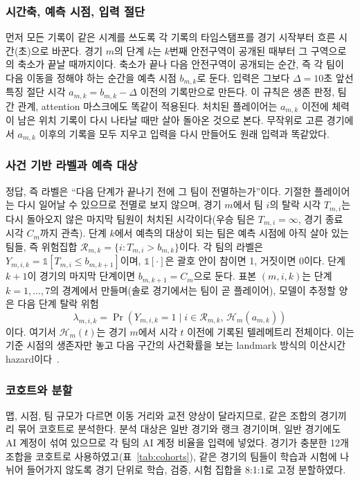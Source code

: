 \subsubsection{시간축, 예측 시점, 입력 절단}
먼저 모든 기록이 같은 시계를 쓰도록 각 기록의 타임스탬프를 경기 시작부터 흐른 시간(초)으로 바꾼다.
경기 $m$의 단계 $k$는 $k$번째 안전구역이 공개된 때부터 그 구역으로의 축소가 끝날 때까지이다.
축소가 끝나 다음 안전구역이 공개되는 순간, 즉 각 팀이 다음 이동을 정해야 하는 순간을 예측 시점 $b_{m,k}$로 둔다.
입력은 그보다 $\Delta=10$초 앞선 특징 절단 시각 $a_{m,k}=b_{m,k}-\Delta$ 이전의 기록만으로 만든다.
이 규칙은 생존 판정, 팀 간 관계, attention 마스크에도 똑같이 적용된다.
처치된 플레이어는 $a_{m,k}$ 이전에 체력이 남은 위치 기록이 다시 나타날 때만 살아 돌아온 것으로 본다.
무작위로 고른 경기에서 $a_{m,k}$ 이후의 기록을 모두 지우고 입력을 다시 만들어도 원래 입력과 똑같았다.

\subsubsection{사건 기반 라벨과 예측 대상}
정답, 즉 라벨은 “다음 단계가 끝나기 전에 그 팀이 전멸하는가”이다.
기절한 플레이어는 다시 일어날 수 있으므로 전멸로 보지 않으며, 경기 $m$에서 팀 $i$의 탈락 시각 $T_{m,i}$는 다시 돌아오지 않은 마지막 팀원이 처치된 시각이다(우승 팀은 $T_{m,i}=\infty$, 경기 종료 시각 $C_m$까지 관측).
단계 $k$에서 예측의 대상이 되는 팀은 예측 시점에 아직 살아 있는 팀들, 즉 위험집합 $\mathcal{R}_{m,k}=\{i: T_{m,i}>b_{m,k}\}$이다.
각 팀의 라벨은 $Y_{m,i,k}=\mathbb{1}[T_{m,i}\le b_{m,k+1}]$이며, $\mathbb{1}[\cdot]$은 괄호 안이 참이면 1, 거짓이면 0이다. 단계 $k+1$이 경기의 마지막 단계이면 $b_{m,k+1}=C_m$으로 둔다.
표본 $(m,i,k)$는 단계 $k=1,\dots,7$의 경계에서 만들며(솔로 경기에서는 팀이 곧 플레이어), 모델이 추정할 양은 다음 단계 탈락 위험
\begin{equation}
\lambda_{m,i,k}=\Pr\!\left(Y_{m,i,k}=1 \mid i\in\mathcal{R}_{m,k},\,\mathcal{H}_{m}(a_{m,k})\right)
\label{eq:hazard}
\end{equation}
이다. 여기서 $\mathcal{H}_{m}(t)$는 경기 $m$에서 시각 $t$ 이전에 기록된 텔레메트리 전체이다.
이는 기준 시점의 생존자만 놓고 다음 구간의 사건확률을 보는 landmark 방식의 이산시간 hazard이다~\cite{SingerWillett93,vanHouwelingen07}.

\subsubsection{코호트와 분할}
\label{sec:method:cohort}
맵, 시점, 팀 규모가 다르면 이동 거리와 교전 양상이 달라지므로, 같은 조합의 경기끼리 묶어 코호트로 분석한다.
분석 대상은 일반 경기와 랭크 경기이며, 
일반 경기에도 AI 계정이 섞여 있으므로 각 팀의 AI 계정 비율을 입력에 넣었다.
경기가 충분한 12개 조합을 코호트로 사용하였고(표~\ref{tab:cohorts}), 같은 경기의 팀들이 학습과 시험에 나뉘어 들어가지 않도록 경기 단위로 학습, 검증, 시험 집합을 8:1:1로 고정 분할하였다.

